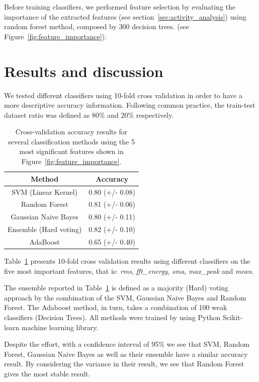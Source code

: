 Before training classifiers, we performed feature selection by evaluating the importance of the extracted features (see section~\ref{sec:activity_analysis}) using random forest method, composed by 300 decision trees. (see Figure~\ref{fig:feature_importance}).

\section{Results and discussion}\label{sec:activity_discussion}

We tested different classifiers using 10-fold cross validation in order to have a more descriptive accuracy information. Following common practice, the train-test dataset ratio was defined as 80\% and 20\% respectively.

\begin{table}[h]\footnotesize
  \centering
  \caption{Cross-validation accuracy results for several classification methods using the 5 most significant features shown in Figure~\ref{fig:feature_importance}.
  }
  \begin{tabular}{| c | c |}
    \hline
  	   \textbf{Method}          & \textbf{Accuracy}\\\hline
       SVM (Linear Kernel)      & 0.80 (+/- 0.08)  \\\hline
       Random Forest            & 0.81 (+/- 0.06)  \\\hline
       Gaussian Naive Bayes     & 0.80 (+/- 0.11)  \\\hline
       Ensemble (Hard voting)   & 0.82 (+/- 0.10)  \\\hline
       AdaBoost                 & 0.65 (+/- 0.40)   \\\hline
  \end{tabular}
  \label{accuracy5best}
\end{table}


Table~\ref{accuracy5best} presents 10-fold cross validation results using different classifiers on the five most important features, that is: \textit{rms}, \textit{fft\_energy}, \textit{sma}, \textit{max\_peak} and \textit{mean}. 

The ensemble reported in Table~\ref{accuracy5best} is defined as a majority (Hard) voting approach by the combination of the SVM, Gaussian Naive Bayes and Random Forest. The Adaboost method, in turn, takes a combination of 100 weak classifiers (Decision Trees). All methods were trained by using Python Scikit-learn machine learning library.

Despite the effort, with a confidence interval of 95\% we see that SVM, Random Forest, Gaussian Naive Bayes as well as their ensemble have a similar accuracy result. By considering the variance in their result, we see that Random Forest gives the most stable result. 

